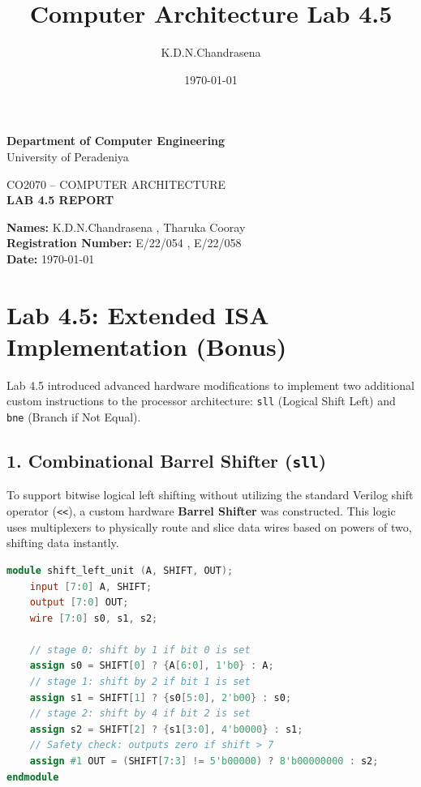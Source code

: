 \documentclass[12pt,a4paper]{article}
\title{Computer Architecture Lab 4.5}
\author{K.D.N.Chandrasena}
\date{\today}
\begin{document}
\begin{center}
{\Large \textbf{Department of Computer Engineering}}\\
\vspace{0.2cm}
{\large University of Peradeniya}\\
\vspace{0.6cm}

{\large CO2070 -- COMPUTER ARCHITECTURE}\\
\vspace{0.3cm}
{\Large \textbf{LAB 4.5 REPORT}}\\
\vspace{0.2cm}

\end{center}
{\large
\textbf{Names:} K.D.N.Chandrasena , Tharuka Cooray\\[0.3cm]
\textbf{Registration Number:} E/22/054 , E/22/058\\[0.3cm]
\textbf{Date:} \today
}

\vspace{1cm}

\section*{Lab 4.5: Extended ISA Implementation (Bonus)}

Lab 4.5 introduced advanced hardware modifications to implement two additional custom instructions to the processor architecture: \texttt{sll} (Logical Shift Left) and \texttt{bne} (Branch if Not Equal).

\subsection*{1. Combinational Barrel Shifter (\texttt{sll})}
To support bitwise logical left shifting without utilizing the standard Verilog shift operator (\texttt{<<}), a custom hardware \textbf{Barrel Shifter} was constructed. This logic uses multiplexers to physically route and slice data wires based on powers of two, shifting data instantly.

\begin{lstlisting}[language=Verilog, caption=Barrel Shifter Implementation]
module shift_left_unit (A, SHIFT, OUT);
    input [7:0] A, SHIFT;
    output [7:0] OUT;
    wire [7:0] s0, s1, s2;
    
    // stage 0: shift by 1 if bit 0 is set
    assign s0 = SHIFT[0] ? {A[6:0], 1'b0} : A;
    // stage 1: shift by 2 if bit 1 is set
    assign s1 = SHIFT[1] ? {s0[5:0], 2'b00} : s0;
    // stage 2: shift by 4 if bit 2 is set
    assign s2 = SHIFT[2] ? {s1[3:0], 4'b0000} : s1;
    // Safety check: outputs zero if shift > 7
    assign #1 OUT = (SHIFT[7:3] != 5'b00000) ? 8'b00000000 : s2;
endmodule
\end{lstlisting}
\end{document}
